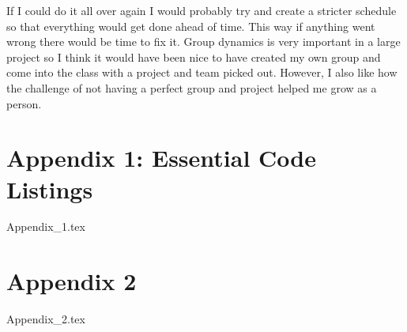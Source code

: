 \documentclass[onecolumn, draftclsnofoot,10pt, compsoc]{IEEEtran}
\begin{document}
	If I could do it all over again I would probably try and create a stricter schedule so that everything would get done ahead of time. This way if anything went wrong there would be time to fix it. Group dynamics is very important in a large project so I think it would have been nice to have created my own group and come into the class with a project and team picked out. However, I also like how the challenge of not having a perfect group and project helped me grow as a person.
	\newpage
	\section{Appendix 1: Essential Code Listings}
		{Appendix_1.tex}
	\newpage
	\section{Appendix 2}
		{Appendix_2.tex}
	\newpage
	
	
	
	
	
\end{document}
